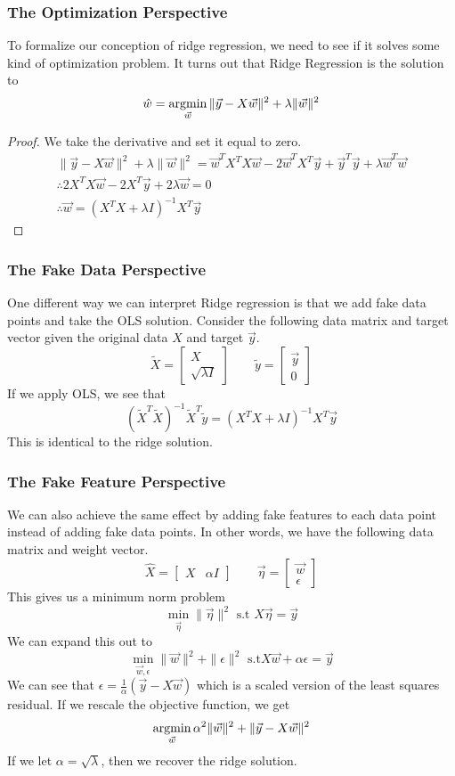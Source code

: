\subsubsection{The Optimization Perspective}
To formalize our conception of ridge regression, we need to see if it solves some kind of optimization problem. It turns out that Ridge Regression is the solution to
\[
  \hat{w} = \operatorname*{argmin}_{\vec{w}} \|\vec{y} - X\vec{w}\|^2 + \lambda \|\vec{w}\|^2
\]
\begin{proof}
  We take the derivative and set it equal to zero.
  \begin{align*}
    \|\vec{y}-X\vec{w}\|^2 + \lambda \|\vec{w}\|^2 = \vec{w}^TX^TX\vec{w}-2\vec{w}^TX^T\vec{y}+\vec{y}^T\vec{y}+\lambda\vec{w}^T\vec{w}\\
    \therefore 2X^TX\vec{w}-2X^T\vec{y}+2\lambda\vec{w} = 0\\
    \therefore \vec{w} = (X^TX+\lambda I)^{-1}X^T\vec{y}
    \label{proof:ridge-optimization}
  \end{align*}
\end{proof}
\subsubsection{The Fake Data Perspective}
One different way we can interpret Ridge regression is that we add fake data points and take the OLS solution. Consider the following data matrix and target vector given the original data $X$ and target $\vec{y}$.
\[
  \tilde{X} = \begin{bmatrix}
    X\\
    \sqrt{\lambda I}
  \end{bmatrix} \qquad \tilde{y} = \begin{bmatrix}
    \vec{y}\\
    0
  \end{bmatrix}
\]
If we apply OLS, we see that
\[
  (\tilde{X}^T\tilde{X})^{-1}\tilde{X}^T\tilde{y} = (X^TX+\lambda I)^{-1}X^T\vec{y}
\]
This is identical to the ridge solution.
\subsubsection{The Fake Feature Perspective}
We can also achieve the same effect by adding fake features to each data point instead of adding fake data points. In other words, we have the following data matrix and weight vector.
\[
  \hat{X} = \begin{bmatrix}
    X & \alpha I
  \end{bmatrix} \qquad \vec{\eta} = \begin{bmatrix}
    \vec{w}\\
    \epsilon
  \end{bmatrix}
\]
This gives us a minimum norm problem
$$\min_{\vec{\eta}}\|\vec{\eta}\|^2 \text{ s.t } \hat{X}\vec{\eta}=\vec{y}$$
We can expand this out to
$$\min_{\vec{w}, \epsilon}\|\vec{w}\|^2+\|\epsilon\|^2 \text{ s.t} X\vec{w}+\alpha\epsilon=\vec{y}$$
We can see that $\epsilon=\frac{1}{\alpha}(\vec{y}-X\vec{w})$ which is a scaled version of the least squares residual. If we rescale the objective function, we get
$$\operatorname*{argmin}_{\vec{w}}\alpha^2\|\vec{w}\|^2+\|\vec{y}-X\vec{w}\|^2$$
If we let $\alpha=\sqrt{\lambda}$, then we recover the ridge solution.
